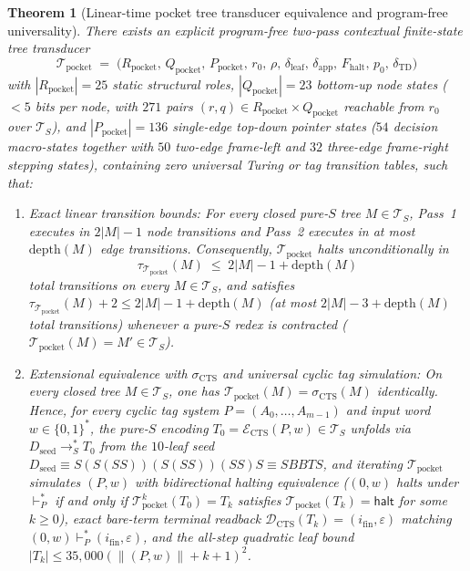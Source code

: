 \documentclass[11pt,reqno]{amsart}
\numberwithin{equation}{section}
\theoremstyle{plain}
\newtheorem{theorem}{Theorem}[section]
\theoremstyle{definition}
\theoremstyle{remark}
\newcommand{\TS}{\mathcal{T}_S}
\newcommand{\redSs}{\to_S^*}
\begin{document}
\begin{theorem}[Linear-time pocket tree transducer equivalence and program-free universality]\label{thm:pocket-transducer-universality}
There exists an explicit program-free two-pass contextual finite-state tree transducer
\[
  \mathcal{T}_{\mathrm{pocket}} \;=\; \bigl(R_{\mathrm{pocket}},\, Q_{\mathrm{pocket}},\, P_{\mathrm{pocket}},\, r_0,\, \rho,\, \delta_{\mathrm{leaf}},\, \delta_{\mathrm{app}},\, F_{\mathrm{halt}},\, p_0,\, \delta_{\mathrm{TD}}\bigr)
\]
with $|R_{\mathrm{pocket}}| = 25$ static structural roles, $|Q_{\mathrm{pocket}}| = 23$ bottom-up node states ($< 5$ bits per node, with $271$ pairs $(r, q) \in R_{\mathrm{pocket}} \times Q_{\mathrm{pocket}}$ reachable from $r_0$ over $\TS$), and $|P_{\mathrm{pocket}}| = 136$ single-edge top-down pointer states ($54$ decision macro-states together with $50$ two-edge frame-left and $32$ three-edge frame-right stepping states), containing zero universal Turing or tag transition tables, such that:
\begin{enumerate}[label=(\roman*),leftmargin=2.2em]
  \item \emph{Exact linear transition bounds:} For every closed pure-$S$ tree $M \in \TS$, Pass~1 executes in $2|M| - 1$ node transitions and Pass~2 executes in at most $\mathrm{depth}(M)$ edge transitions. Consequently, $\mathcal{T}_{\mathrm{pocket}}$ halts unconditionally in
  \begin{equation}\label{eq:pocket-linear-bound}
    \tau_{\mathcal{T}_{\mathrm{pocket}}}(M) \;\le\; 2|M| - 1 + \mathrm{depth}(M)
  \end{equation}
  total transitions on every $M \in \TS$, and satisfies $\tau_{\mathcal{T}_{\mathrm{pocket}}}(M) + 2 \le 2|M| - 1 + \mathrm{depth}(M)$ (at most $2|M| - 3 + \mathrm{depth}(M)$ total transitions) whenever a pure-$S$ redex is contracted ($\mathcal{T}_{\mathrm{pocket}}(M) = M' \in \TS$).
  \item \emph{Extensional equivalence with $\sigma_{\mathrm{CTS}}$ and universal cyclic tag simulation:} On every closed tree $M \in \TS$, one has $\mathcal{T}_{\mathrm{pocket}}(M) = \sigma_{\mathrm{CTS}}(M)$ identically. Hence, for every cyclic tag system $P = (A_0, \dots, A_{m-1})$ and input word $w \in \{0,1\}^*$, the pure-$S$ encoding $T_0 = \mathcal{E}_{\mathrm{CTS}}(P, w) \in \TS$ unfolds via $D_{\mathrm{seed}} \redSs T_0$ from the $10$-leaf seed $D_{\mathrm{seed}} \equiv S(S(S S))(S(S S))(S S)S \equiv S B B T S$, and iterating $\mathcal{T}_{\mathrm{pocket}}$ simulates $(P, w)$ with bidirectional halting equivalence ($(0, w)$ halts under $\vdash_P^*$ if and only if $\mathcal{T}_{\mathrm{pocket}}^k(T_0) = T_k$ satisfies $\mathcal{T}_{\mathrm{pocket}}(T_k) = \mathsf{halt}$ for some $k \ge 0$), exact bare-term terminal readback $\mathcal{D}_{\mathrm{CTS}}(T_k) = (i_{\mathrm{fin}}, \varepsilon)$ matching $(0, w) \vdash_P^* (i_{\mathrm{fin}}, \varepsilon)$, and the all-step quadratic leaf bound $|T_k| \le 35{,}000(\|(P, w)\| + k + 1)^2$.
\end{enumerate}
\end{theorem}
\end{document}
